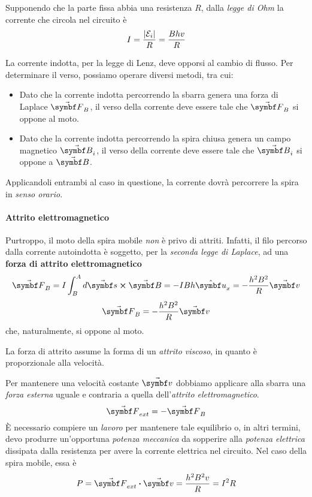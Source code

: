 Supponendo che la parte fissa abbia una resistenza $R$, dalla \textit{legge di Ohm} la corrente che circola nel circuito è
\begin{equation}
	I=\frac{\abs{\mathcal{E}_i}}{R}=\frac{Bhv}{R}
\end{equation}
\begin{observe}
	La corrente indotta, per la legge di Lenz, deve opporsi al cambio di flusso. Per determinare il verso, possiamo operare diversi metodi, tra cui:
	\begin{itemize}
		\item Dato che la corrente indotta percorrendo la sbarra genera una forza di Laplace $\vba{F}_B$, il verso della corrente deve essere tale che $\vba{F}_B$ si oppone al moto.
		\item Dato che la corrente indotta percorrendo la spira chiusa genera un campo magnetico $\vba{B}_i$, il verso della corrente deve essere tale che $\vba{B}_i$ si oppone a $\vba{B}$.
	\end{itemize}
	Applicandoli entrambi al caso in questione, la corrente dovrà percorrere la spira in \textit{senso orario}.
\end{observe}
\paragraph{Attrito elettromagnetico}
Purtroppo, il moto della spira mobile \textit{non} è privo di attriti. Infatti, il filo percorso dalla corrente autoindotta è soggetto, per la \textit{seconda legge di Laplace}, ad una \textbf{forza di attrito elettromagnetico}
\begin{equation*}
	\vba{F}_B=I\int_{B}^{A}d\vba{s}\cross\vba{B}=-IBh\vbh{u}_x=-\frac{h^2B^2}{R}\vba{v}
\end{equation*}
\begin{equation}
	\vba{F}_B=-\frac{h^2B^2}{R}\vba{v}
\end{equation}
che, naturalmente, si oppone al moto.
\begin{observe}
	La forza di attrito assume la forma di un \textit{attrito viscoso}, in quanto è proporzionale alla velocità.
\end{observe}
Per mantenere una velocità costante $\vba{v}$ dobbiamo applicare alla sbarra una \textit{forza esterna} uguale e contraria a quella dell'\textit{attrito elettromagnetico}.
\begin{equation*}
	\vba{F}_{ext}=-\vba{F}_B
\end{equation*}
È necessario compiere un \textit{lavoro} per mantenere tale equilibrio o, in altri termini, devo produrre un'opportuna \textit{potenza meccanica} da sopperire alla \textit{potenza elettrica} dissipata dalla resistenza per avere la corrente elettrica nel circuito.
Nel caso della spira mobile, essa è
\begin{equation}
	P=\vba{F}_{ext}\vdot \vba{v}=\frac{h^2B^2v}{R}=I^2R
\end{equation}
